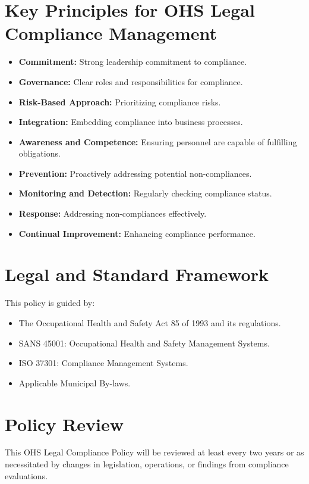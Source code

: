 \documentclass[11pt]{article}
\begin{document}
\section{Key Principles for OHS Legal Compliance Management}
\begin{itemize}
    \item \textbf{Commitment:} Strong leadership commitment to compliance.
    \item \textbf{Governance:} Clear roles and responsibilities for compliance.
    \item \textbf{Risk-Based Approach:} Prioritizing compliance risks.
    \item \textbf{Integration:} Embedding compliance into business processes.
    \item \textbf{Awareness and Competence:} Ensuring personnel are capable of fulfilling obligations.
    \item \textbf{Prevention:} Proactively addressing potential non-compliances.
    \item \textbf{Monitoring and Detection:} Regularly checking compliance status.
    \item \textbf{Response:} Addressing non-compliances effectively.
    \item \textbf{Continual Improvement:} Enhancing compliance performance.
\end{itemize}

\section{Legal and Standard Framework}
This policy is guided by:
\begin{itemize}
    \item The Occupational Health and Safety Act 85 of 1993 and its regulations.
    \item SANS 45001: Occupational Health and Safety Management Systems.
    \item ISO 37301: Compliance Management Systems.
    \item Applicable Municipal By-laws.
\end{itemize}

\section{Policy Review}
This OHS Legal Compliance Policy will be reviewed at least every two years or as necessitated by changes in legislation, operations, or findings from compliance evaluations.
\end{document}
